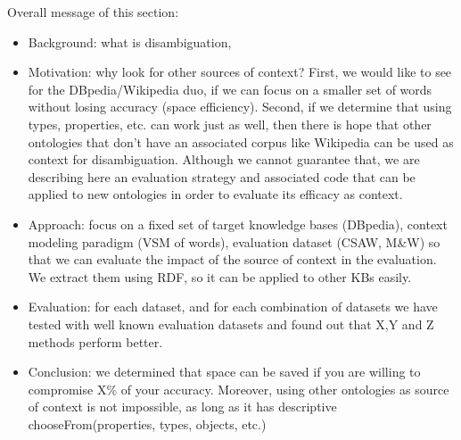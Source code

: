 \documentclass[10pt,a4paper]{article}
\begin{document}
Overall message of this section:
\begin{itemize}
\item Background: what is disambiguation,
\item Motivation: why look for other sources of context? First, we would like to see for the DBpedia/Wikipedia duo, if we can focus on a smaller set of words without losing accuracy (space efficiency). Second, if we determine that using types, properties, etc. can work just as well, then there is hope that other ontologies that don't have an associated corpus like Wikipedia can be used as context for disambiguation. Although we cannot guarantee that, we are describing here an evaluation strategy and associated code that can be applied to new ontologies in order to evaluate its efficacy as context.
\item Approach: focus on a fixed set of target knowledge bases (DBpedia), context modeling paradigm (VSM of words), evaluation dataset (CSAW, M\&W) so that we can evaluate the impact of the source of context in the evaluation. We extract them using RDF, so it can be applied to other KBs easily.
\item Evaluation: for each dataset, and for each combination of datasets we have tested with well known evaluation datasets and found out that X,Y and Z methods perform better.
\item Conclusion: we determined that space can be saved if you are willing to compromise X\% of your accuracy. Moreover, using other ontologies as source of context is not impossible, as long as it has descriptive chooseFrom(properties, types, objects, etc.)
\end{itemize}


\end{document}
